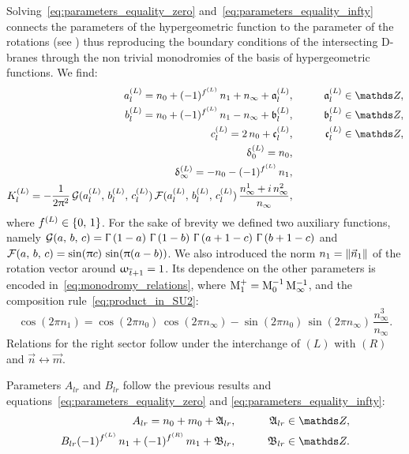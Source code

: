 Solving~\eqref{eq:parameters_equality_zero} and~\eqref{eq:parameters_equality_infty} connects the parameters of the hypergeometric function to the parameter of the rotations (see ) thus reproducing the boundary conditions of the intersecting D-branes through the non trivial monodromies of the basis of hypergeometric functions.
We find:
\begin{eqnarray}
  a_l^{(L)}
  =
  n_{0}
  +
  (-1)^{f^{(L)}}\, n_{1}
  +
  n_{\infty}
  +
  \ffa^{(L)}_l,
  & \qquad &
  \ffa^{(L)}_l \in \Z,
  \\
  b_l^{(L)}
  =
  n_{0}
  +
  (-1)^{f^{(L)}}\, n_{1}
  -
  n_{\infty}
  +
  \ffb^{(L)}_l,
  & \qquad &
  \ffb^{(L)}_l \in \Z,
  \\
  c_l^{(L)}
  =
  2\, n_{0}
  +
  \ffc^{(L)}_l,
  & \qquad &
  \ffc^{(L)}_l \in \Z,
  \\
  \delta_{0}^{(L)}
  =
  n_{0},
  \\
  \delta_{\infty}^{(L)}
  =
  -
  n_{0}
  -
  (-1)^{f^{(L)}}\, n_{1},
  \\
  K^{(L)}_l
  =
  -\frac{1}{2 \pi^2}\,
  \cG(a_l^{(L)},\, b_l^{(L)},\, c_l^{(L)})\,
  \cF(a_l^{(L)},\, b_l^{(L)},\, c_l^{(L)})\,
  \frac{n^1_{\infty}+ i\, n^2_{\infty}}{n_{\infty}},
\label{eq:K_factor_value}
\end{eqnarray}
where $f^{(L)} \in \qty{ 0,\, 1 }$.
For the sake of brevity we defined two auxiliary functions, namely $\mathcal{G}(a,\, b,\, c) = \Upgamma\left( 1-a \right)\, \Upgamma\left( 1-b \right)\, \Upgamma\left( a+1-c \right)\, \Upgamma\left( b+1-c \right)$ and $\mathcal{F}(a,\, b,\, c) = \sin(\uppi c)\, \sin(\uppi(a-b))$.
We also introduced the norm $n_{1} = \norm{\vec{n}_{1}}$ of the rotation vector around $\upomega_{\overline{t}+1} = 1$.
Its dependence on the other parameters is encoded in~\eqref{eq:monodromy_relations}, where $\mathrm{M}^+_{1} = \mathrm{M}^{-1}_{0}\, \mathrm{M}^{-1}_{\infty}$, and the composition rule~\eqref{eq:product_in_SU2}:
\begin{equation}
  \cos(2\pi n_{1})
  =
  \cos(2\pi n_{0})\,
  \cos(2\pi n_{\infty})
  -
  \sin(2\pi n_{0})\,
  \sin(2\pi n_{\infty})\,
  \frac{n_{\infty}^3}{n_{\infty}}.
  \label{eq:dependent_monodromy_main_text}
\end{equation}
Relations for the right sector follow under the interchange of $(L)$ with $(R)$ and $\vec{n} \leftrightarrow \vec{m}$.

Parameters $A_{lr}$ and $B_{lr}$ follow the previous results and equations~\eqref{eq:parameters_equality_zero} and \eqref{eq:parameters_equality_infty}:
\begin{eqnarray}
  A_{lr}
  =
  n_{0} + m_{0} + \ffA_{lr},
  & \qquad &
  \ffA_{lr} \in \Z,
  \\
  B_{lr}
  (-1)^{f^{(L)}}\, n_{1} + (-1)^{f^{(R)}}\, m_{1} + \ffB_{lr},
  & \qquad &
  \ffB_{lr} \in \Z.
\end{eqnarray}


